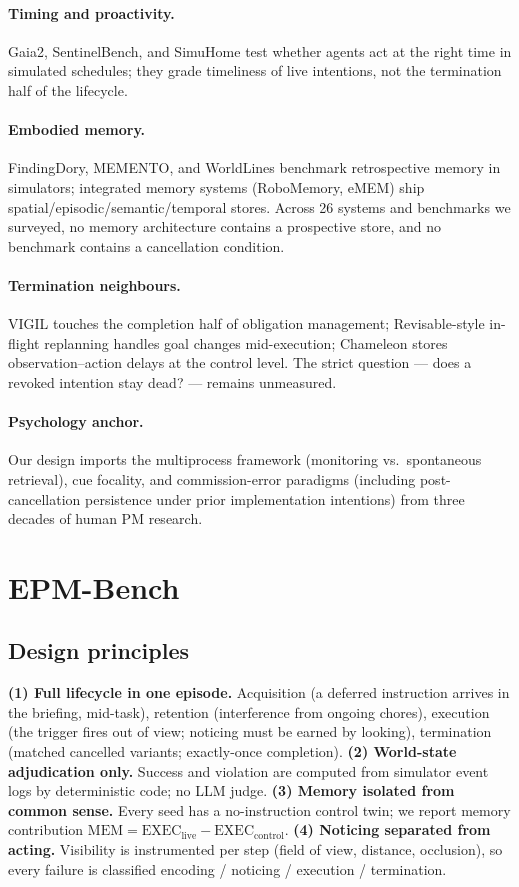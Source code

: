 \documentclass[10pt]{article}
\begin{document}
\paragraph{Timing and proactivity.} Gaia2, SentinelBench, and SimuHome
test whether agents act at the right time in simulated schedules; they
grade timeliness of live intentions, not the termination half of the
lifecycle.

\paragraph{Embodied memory.} FindingDory, MEMENTO, and WorldLines
benchmark retrospective memory in simulators; integrated memory systems
(RoboMemory, eMEM) ship spatial/episodic/semantic/temporal stores. Across
26 systems and benchmarks we surveyed, no memory architecture contains a
prospective store, and no benchmark contains a cancellation condition.

\paragraph{Termination neighbours.} VIGIL touches the completion half of
obligation management; Revisable-style in-flight replanning handles goal
changes mid-execution; Chameleon stores observation--action delays at the
control level. The strict question --- does a revoked intention stay
dead? --- remains unmeasured.

\paragraph{Psychology anchor.} Our design imports the multiprocess
framework (monitoring vs.\ spontaneous retrieval), cue focality, and
commission-error paradigms (including post-cancellation persistence under
prior implementation intentions) from three decades of human PM research.

\section{EPM-Bench}\label{sec:bench}

\subsection{Design principles}
\textbf{(1) Full lifecycle in one episode.} Acquisition (a deferred
instruction arrives in the briefing, mid-task), retention (interference
from ongoing chores), execution (the trigger fires out of view; noticing
must be earned by looking), termination (matched cancelled variants;
exactly-once completion).
\textbf{(2) World-state adjudication only.} Success and violation are
computed from simulator event logs by deterministic code; no LLM judge.
\textbf{(3) Memory isolated from common sense.} Every seed has a
no-instruction control twin; we report memory contribution
$\mathrm{MEM}=\mathrm{EXEC}_{\text{live}}-\mathrm{EXEC}_{\text{control}}$.
\textbf{(4) Noticing separated from acting.} Visibility is instrumented
per step (field of view, distance, occlusion), so every failure is
classified encoding / noticing / execution / termination.
\end{document}
